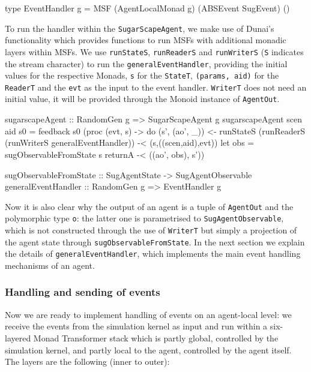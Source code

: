 \begin{HaskellCode}
type EventHandler g = MSF (AgentLocalMonad g) (ABSEvent SugEvent) ()
\end{HaskellCode}

To run the handler within the \texttt{SugarScapeAgent}, we make use of Dunai's functionality which provides functions to run MSFs with additional monadic layers within MSFs. We use \texttt{runStateS}, \texttt{runReaderS} and \texttt{runWriterS} (\texttt{S} indicates the stream character) to run the \texttt{generalEventHandler}, providing the initial values for the respective Monads, \texttt{s} for the \texttt{StateT}, \texttt{(params, aid)} for the \texttt{ReaderT} and the \texttt{evt} as the input to the event handler. \texttt{WriterT} does not need an initial value, it will be provided through the Monoid instance of \texttt{AgentOut}.

\begin{HaskellCode}
sugarscapeAgent :: RandomGen g => SugarScapeAgent g
sugarscapeAgent scen aid s0 = feedback s0 (proc (evt, s) -> do
  (s', (ao', _)) <- runStateS 
                      (runReaderS 
                        (runWriterS generalEventHandler)) -< (s,((scen,aid),evt))
  let obs = sugObservableFromState s
  returnA -< ((ao', obs), s'))

sugObservableFromState :: SugAgentState -> SugAgentObservable
generalEventHandler :: RandomGen g => EventHandler g
\end{HaskellCode}

Now it is also clear why the output of an agent is a tuple of \texttt{AgentOut} and the polymorphic type \texttt{o}: the latter one is parametrised to \texttt{SugAgentObservable}, which is not constructed through the use of \texttt{WriterT} but simply a projection of the agent state through \texttt{sugObservableFromState}. In the next section we explain the details of \texttt{generalEventHandler}, which implements the main event handling mechanisms of an agent.

\subsubsection{Handling and sending of events}
Now we are ready to implement handling of events on an agent-local level: we receive the events from the simulation kernel as input and run within a six-layered Monad Transformer stack which is partly global, controlled by the simulation kernel, and partly local to the agent, controlled by the agent itself. The layers are the following (inner to outer):

